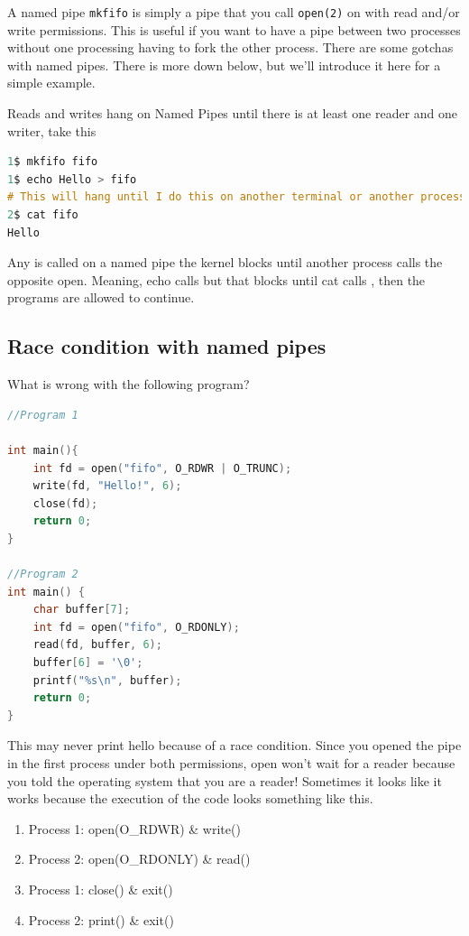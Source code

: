 A named pipe \texttt{mkfifo} is simply a pipe that you call \texttt{open(2)} on with read and/or write permissions. This is useful if you want to have a pipe between two processes without one processing having to fork the other process. There are some gotchas with named pipes. There is more down below, but we'll introduce it here for a simple example.

Reads and writes hang on Named Pipes until there is at least one reader and one writer, take this

\begin{lstlisting}[language=C]
1$ mkfifo fifo
1$ echo Hello > fifo
# This will hang until I do this on another terminal or another process
2$ cat fifo
Hello
\end{lstlisting}

Any  is called on a named pipe the kernel blocks until another process calls the opposite open. Meaning, echo calls  but that blocks until cat calls , then the programs are allowed to continue.

\subsection{Race condition with named pipes}

What is wrong with the following program?

\begin{lstlisting}[language=C]
//Program 1

int main(){
    int fd = open("fifo", O_RDWR | O_TRUNC);
    write(fd, "Hello!", 6);
    close(fd);
    return 0;
}

//Program 2
int main() {
    char buffer[7];
    int fd = open("fifo", O_RDONLY);
    read(fd, buffer, 6);
    buffer[6] = '\0';
    printf("%s\n", buffer);
    return 0;
}
\end{lstlisting}

This may never print hello because of a race condition. Since you opened the pipe in the first process under both permissions, open won't wait for a reader because you told the operating system that you are a reader! Sometimes it looks like it works because the execution of the code looks something like this.

\begin{enumerate}
\item Process 1: open(O\_RDWR) \& write()
\item Process 2: open(O\_RDONLY) \& read()
\item Process 1: close() \& exit()
\item Process 2: print() \& exit()
\end{enumerate}

